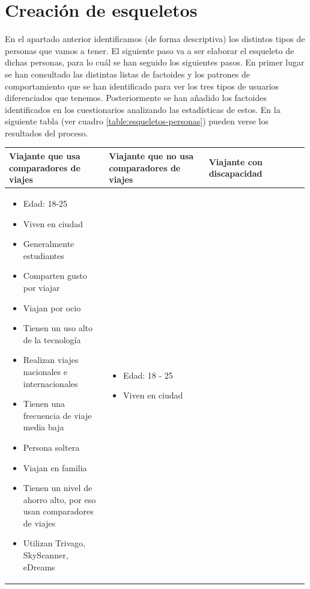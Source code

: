\section{Creación de esqueletos}
En el apartado anterior identificamos (de forma descriptiva) los distintos tipos de personas que vamos a tener. El siguiente paso va a ser elaborar el esqueleto de dichas personas, para lo cuál se han seguido los siguientes pasos. En primer lugar se han consultado las distintas listas de factoides y los patrones de comportamiento que se han identificado para ver los tres tipos de usuarios diferenciados que tenemos. Posteriormente se han añadido los factoides identificados en los cuestionarios analizando las estadísticas de estos. En la siguiente tabla (ver cuadro \ref{table:esqueletos-personas}) pueden verse los resultados del proceso.
\begin{table}[h]
    \centering
    \begin{tabular}{|p{0.33\linewidth}|p{0.33\linewidth}|p{0.33\linewidth}|}
        \hline
        Viajante que usa comparadores de viajes & Viajante que no usa comparadores de viajes & Viajante con discapacidad \\ \hline
        \begin{itemize}
            \item Edad: 18-25
            \item Viven en ciudad
            \item Generalmente estudiantes
            \item Comparten gusto por viajar
            \item Viajan por ocio
            \item Tienen un uso alto de la tecnología
            \item Realizan viajes nacionales e internacionales
            \item Tienen una frecuencia de viaje media baja
            \item Persona soltera
            \item Viajan en familia
            \item Tienen un nivel de ahorro alto, por eso usan comparadores de viajes
            \item Utilizan Trivago, SkyScanner, eDreams            
        \end{itemize}
        &
        \begin{itemize}
            \item Edad: 18 - 25
            \item Viven en ciudad

\end{itemize}
\end{tabular}
\end{table}

